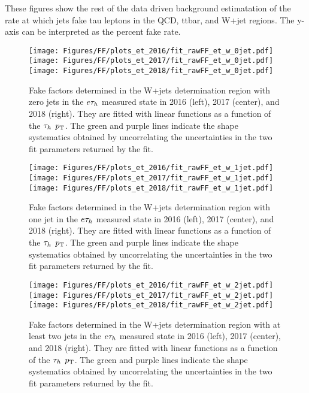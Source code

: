 These figures show the rest of the data driven background estimatation of the rate at which jets fake tau leptons in the QCD, ttbar, and W+jet regions. The y-axis can be interpreted as the percent fake rate. 

\begin{figure}[ht!b]
\centering
\texttt{[image: Figures/FF/plots\_et\_2016/fit\_rawFF\_et\_w\_0jet.pdf]}
\texttt{[image: Figures/FF/plots\_et\_2017/fit\_rawFF\_et\_w\_0jet.pdf]}
\texttt{[image: Figures/FF/plots\_et\_2018/fit\_rawFF\_et\_w\_0jet.pdf]}\\
\caption{\label{fig:fit_raw_et_0jet_w} Fake factors determined in the W+jets determination region with zero jets in the $e\tau_h$ measured state in 2016 (left), 2017 (center), and 2018 (right). They are fitted with linear functions as a function of the $\tau_h$ $p_{\mathrm{T}}$. The green and purple lines indicate the shape systematics obtained by uncorrelating the uncertainties in the two fit parameters returned by the fit.  }
\end{figure}

\begin{figure}[ht!b]
\centering
\texttt{[image: Figures/FF/plots\_et\_2016/fit\_rawFF\_et\_w\_1jet.pdf]}
\texttt{[image: Figures/FF/plots\_et\_2017/fit\_rawFF\_et\_w\_1jet.pdf]}
\texttt{[image: Figures/FF/plots\_et\_2018/fit\_rawFF\_et\_w\_1jet.pdf]}\\
\caption{\label{fig:fit_raw_et_1jet_w} Fake factors determined in the W+jets determination region with one jet in the $e\tau_h$ measured state in 2016 (left), 2017 (center), and 2018 (right). They are fitted with linear functions as a function of the $\tau_h$ $p_{\mathrm{T}}$. The green and purple lines indicate the shape systematics obtained by uncorrelating the uncertainties in the two fit parameters returned by the fit.  }
\end{figure}

\begin{figure}[ht!b]
\centering
\texttt{[image: Figures/FF/plots\_et\_2016/fit\_rawFF\_et\_w\_2jet.pdf]}
\texttt{[image: Figures/FF/plots\_et\_2017/fit\_rawFF\_et\_w\_2jet.pdf]}
\texttt{[image: Figures/FF/plots\_et\_2018/fit\_rawFF\_et\_w\_2jet.pdf]}\\
\caption{\label{fig:fit_raw_et_2jet_w} Fake factors determined in the W+jets determination region with at least two jets in the $e\tau_h$ measured state in 2016 (left), 2017 (center), and 2018 (right). They are fitted with linear functions as a function of the $\tau_h$ $p_{\mathrm{T}}$. The green and purple lines indicate the shape systematics obtained by uncorrelating the uncertainties in the two fit parameters returned by the fit.  }
\end{figure}


